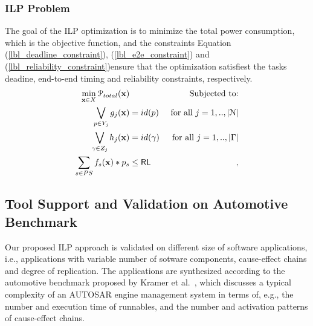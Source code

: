 \subsubsection{ILP Problem}
The goal of the ILP optimization is to minimize the total power consumption, which is the objective function, and the constraints Equation (\ref{lbl_deadline_constraint}), (\ref{lbl_e2e_constraint}) and (\ref{lbl_reliability_constraint})ensure that the optimization satisfiest the tasks deadine, end-to-end timing and reliability constraints, respectively.
\begin{align}
\label{eqn_const_func}
\min_{\x\in X} \mathcal{P}_{total}(\x) && \text{ Subjected to:}\\
\label{lbl_deadline_constraint} 
\bigvee\limits_{p\in Y_j} g_j (\x) &= id(p)& \mbox{ for all } j=1,..,|\mathcal{N}|\\ 
\label{lbl_e2e_constraint}
\bigvee\limits_{\gamma\in Z_j} h_j (\x) &= id(\gamma) & \mbox{ for all } j=1,..,|\Gamma|\\ 
\label{lbl_reliability_constraint}
\sum_{s\in PS}f_s(\x)*p_s &\leq \RL&,
\end{align}

\subsection{Tool Support and Validation on Automotive Benchmark}
Our proposed ILP approach is validated on different size of software applications, i.e., applications with variable number of sotware components, cause-effect chains and degree of replication. The applications are synthesized according to the automotive benchmark proposed by Kramer et al.~\cite{Kramer2015RealFree}, which discusses a typical complexity of an AUTOSAR engine management system in terms of, e.g., the number and execution time of runnables, and the number and activation patterns of cause-effect chains. 

